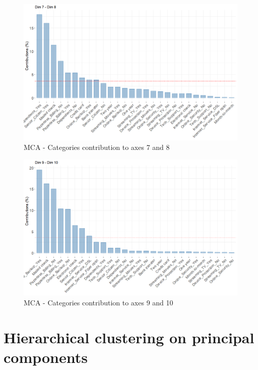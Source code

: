 \documentclass[
]{book}
\begin{document}
\begin{figure}

{\centering \includegraphics[width=15.28in]{./imgs/mca_contrib_78} 

}

\caption{MCA -  Categories contribution to axes 7 and 8}\label{fig:mcacontrib78}
\end{figure}

\begin{figure}

{\centering \includegraphics[width=15.28in]{./imgs/mca_contrib_910} 

}

\caption{MCA -  Categories contribution to axes 9 and 10}\label{fig:mcacontrib910}
\end{figure}

\hypertarget{hierarchical-clustering-on-principal-components-1}{%
\section*{Hierarchical clustering on principal components}\label{hierarchical-clustering-on-principal-components-1}}
\end{document}

